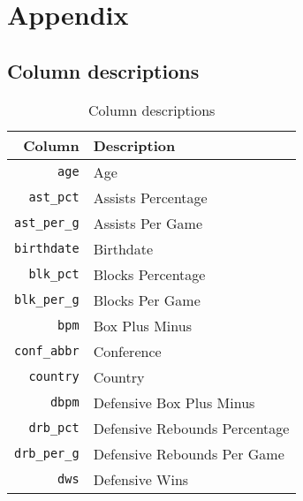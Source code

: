 
\section{Appendix}%
\label{sec:appendix}

\subsection{Column descriptions}%
\label{asub:column-descriptions}

\begin{table}[H]
  \centering
  \caption{Column descriptions}
  \label{tab:column-descriptions}
  \begin{tabular}{rl}
    \toprule
    \textbf{Column} & \textbf{Description} \\
    \midrule
    \texttt{age}                 & Age                                                           \\
    \texttt{ast\_pct}            & Assists Percentage                                            \\
    \texttt{ast\_per\_g}         & Assists Per Game                                              \\
    \texttt{birthdate}           & Birthdate                                                     \\
    \texttt{blk\_pct}            & Blocks Percentage                                             \\
    \texttt{blk\_per\_g}         & Blocks Per Game                                               \\
    \texttt{bpm}                 & Box Plus Minus                                                \\
    \texttt{conf\_abbr}          & Conference                                                    \\
    \texttt{country}             & Country                                                       \\
    \texttt{dbpm}                & Defensive Box Plus Minus                                      \\
    \texttt{drb\_pct}            & Defensive Rebounds Percentage                                 \\
    \texttt{drb\_per\_g}         & Defensive Rebounds Per Game                                   \\
    \texttt{dws}                 & Defensive Wins                                                \\

\end{tabular}
\end{table}
